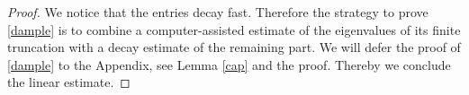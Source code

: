 \documentclass[10pt,a4paper]{amsart}
\begin{document}
\begin{proof}
We notice that the entries decay fast. {Therefore the strategy to prove \eqref{dample} is to combine a computer-assisted estimate of the eigenvalues of its finite truncation with a decay estimate of the remaining part. We will defer the proof of \eqref{dample} to the Appendix, see Lemma \ref{cap} and the proof}. Thereby we conclude the linear estimate.
\end{proof}
\end{document}
